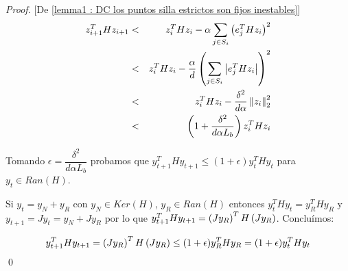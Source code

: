 \begin{proof}{[De \ref{lemma1 : DC los puntos silla estrictos son fijos inestables}]}
	\begin{equation*}
	\begin{aligned}
	z_{i+1}^THz_{i+1} & < & z_i^T H z_i -  \alpha \sum\limits_{j \in S_i}{\left(e_j^T H z_i\right)^2} \\
	& < &  z_i^T H z_i -  \frac{\alpha}{d} \left(\sum\limits_{j \in S_i}{\left\lvert e_j^T H z_i\right\rvert}\right)^2 \\
	& < &  z_i^T H z_i -  \dfrac{\delta^2}{d\alpha} \left\lVert z_i\right\rVert_2^2\\
	& < &  \left(1 +  \dfrac{\delta^2}{d\alpha L_b}\right)z_i^T H z_i
	\end{aligned}
	\end{equation*}
	
	Tomando $\epsilon = \dfrac{\delta^2}{d\alpha L_b}$ probamos que $y_{t+1}^THy_{t+1} \leq (1+\epsilon) y_{t}^THy_{t} $ para $y_t \in Ran(H)$.
	
	Si $y_t = y_N + y_R$ con $y_N \in Ker(H)$, $y_R \in Ran(H)$ entonces $y_{t}^THy_{t} = y_{R}^THy_{R}$ y $y_{t+1} = Jy_t = y_N + Jy_R$ por lo que $y_{t+1}^THy_{t+1} = \left(Jy_{R}\right)^TH\left(Jy_{R}\right)$. Conclu\'imos:
	
	\begin{equation*}
	y_{t+1}^THy_{t+1} = \left(Jy_{R}\right)^TH\left(Jy_{R}\right) \leq (1+\epsilon) y_{R}^THy_{R} = (1+\epsilon) y_{t}^THy_{t}
	\end{equation*}
	\qed
\end{proof}


